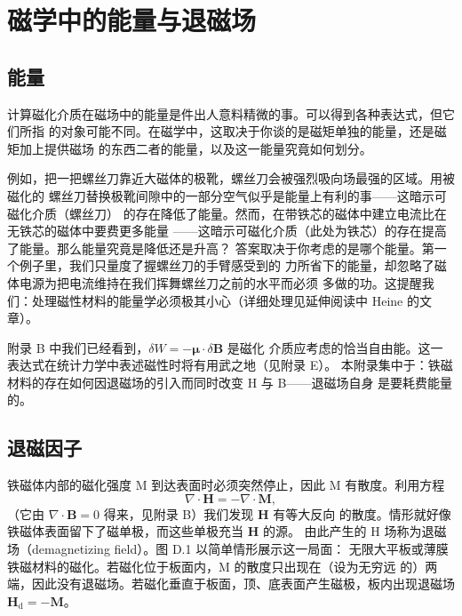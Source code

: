\chapter{磁学中的能量与退磁场}

\section{能量}

计算磁化介质在磁场中的能量是件出人意料精微的事。可以得到各种表达式，但它们所指
的对象可能不同。在磁学中，这取决于你谈的是磁矩单独的能量，还是磁矩加上提供磁场
的东西二者的能量，以及这一能量究竟如何划分。

例如，把一把螺丝刀靠近大磁体的极靴，螺丝刀会被强烈吸向场最强的区域。用被磁化的
螺丝刀替换极靴间隙中的一部分空气似乎是能量上有利的事——这暗示可磁化介质（螺丝刀）
的存在降低了能量。然而，在带铁芯的磁体中建立电流比在无铁芯的磁体中要费更多能量
——这暗示可磁化介质（此处为铁芯）的存在提高了能量。那么能量究竟是降低还是升高？
答案取决于你考虑的是哪个能量。第一个例子里，我们只量度了握螺丝刀的手臂感受到的
力所省下的能量，却忽略了磁体电源为把电流维持在我们挥舞螺丝刀之前的水平而必须
多做的功。这提醒我们：处理磁性材料的能量学必须极其小心（详细处理见延伸阅读中
Heine 的文章）。

附录 B 中我们已经看到，$\delta W=-\boldsymbol{\mu}\cdot\delta\mathbf{B}$ 是磁化
介质应考虑的恰当自由能。这一表达式在统计力学中表述磁性时将有用武之地（见附录 E）。
本附录集中于：铁磁材料的存在如何因退磁场的引入而同时改变 H 与 B——退磁场自身
是要耗费能量的。

\section{退磁因子}

铁磁体内部的磁化强度 M 到达表面时必须突然停止，因此 M 有散度。利用方程
\begin{equation*}
\nabla\cdot\mathbf{H} = -\nabla\cdot\mathbf{M},\tag{D.1}
\end{equation*}
（它由 $\nabla\cdot\mathbf{B}=0$ 得来，见附录 B）我们发现 $\mathbf{H}$ 有等大反向
的散度。情形就好像铁磁体表面留下了磁单极，而这些单极充当 $\mathbf{H}$ 的源。
由此产生的 H 场称为退磁场（demagnetizing field）。图 D.1 以简单情形展示这一局面：
无限大平板或薄膜铁磁材料的磁化。若磁化位于板面内，M 的散度只出现在（设为无穷远
的）两端，因此没有退磁场。若磁化垂直于板面，顶、底表面产生磁极，板内出现退磁场
$\mathbf{H}_{\mathrm{d}}=-\mathbf{M}$。

